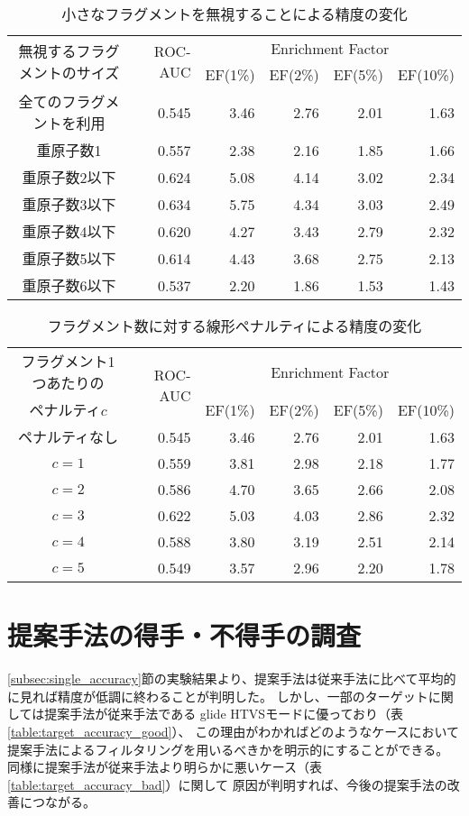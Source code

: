 \begin{table}[t] \centering
	\caption{小さなフラグメントを無視することによる精度の変化}
	\label{table:omit}
	\begin{tabular}{c|rrrrr}
	\hline
	\multirow{2}{*}{無視するフラグメントのサイズ}	&\multirow{2}{*}{ROC-AUC}	&\multicolumn{4}{c}{Enrichment Factor}				\\
										&						&EF(1\%)		&EF(2\%)		&EF(5\%)		&EF(10\%)	\\ \hline
	全てのフラグメントを利用					&0.545					&3.46		&2.76		&2.01		&1.63		\\
	重原子数1							&0.557					&2.38		&2.16		&1.85		&1.66		\\
	重原子数2以下						&0.624					&5.08		&4.14		&3.02		&2.34		\\
	重原子数3以下						&0.634					&5.75		&4.34		&3.03		&2.49		\\
	重原子数4以下						&0.620					&4.27		&3.43		&2.79		&2.32		\\
	重原子数5以下						&0.614					&4.43		&3.68		&2.75		&2.13		\\
	重原子数6以下						&0.537					&2.20		&1.86		&1.53		&1.43		\\ \hline
	\end{tabular}
\end{table}

\begin{table}[hp] \centering
	\caption{フラグメント数に対する線形ペナルティによる精度の変化}
	\label{table:penalty}
	\begin{tabular}{c|rrrrr}
	\hline
	フラグメント1つあたりの	&\multirow{2}{*}{ROC-AUC}	&\multicolumn{4}{c}{Enrichment Factor}				\\
	ペナルティ$c$			&						&EF(1\%)		&EF(2\%)		&EF(5\%)		&EF(10\%)	\\ \hline
	ペナルティなし			&0.545					&3.46		&2.76		&2.01		&1.63		\\
	$c=1$				&0.559					&3.81		&2.98		&2.18		&1.77		\\
	$c=2$				&0.586					&4.70		&3.65		&2.66		&2.08		\\
	$c=3$				&0.622					&5.03		&4.03		&2.86		&2.32		\\
	$c=4$				&0.588					&3.80		&3.19		&2.51		&2.14		\\
	$c=5$				&0.549					&3.57		&2.96		&2.20		&1.78		\\ \hline
	\end{tabular}
\end{table}


\section{提案手法の得手・不得手の調査}
\ref{subsec:single_accuracy}節の実験結果より、提案手法は従来手法に比べて平均的に見れば精度が低調に終わることが判明した。
しかし、一部のターゲットに関しては提案手法が従来手法である glide HTVSモードに優っており（表\ref{table:target_accuracy_good}）、
この理由がわかればどのようなケースにおいて提案手法によるフィルタリングを用いるべきかを明示的にすることができる。
同様に提案手法が従来手法より明らかに悪いケース（表\ref{table:target_accuracy_bad}）に関して
原因が判明すれば、今後の提案手法の改善につながる。

